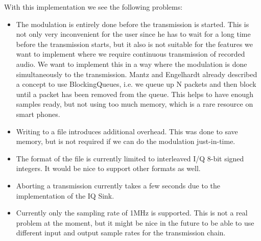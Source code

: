 \pagebreak
With this implementation we see the following problems: 
\begin{itemize}
	\item The modulation is entirely done before the transmission is started. This is not only very inconvenient for the user since he has to wait for a long time before the transmission starts, but it also is not suitable for the features we want to implement where we require continuous transmission of recorded audio. We want to implement this in a way where the modulation is done simultaneously to the transmission. Mantz and Engelhardt \cite{Mantz2016} already described a concept to use BlockingQueues, i.e. we queue up N packets and then block until a packet has been removed from the queue. This helps to have enough samples ready, but not using too much memory, which is a rare resource on smart phones. 
	\item Writing to a file introduces additional overhead. This was done to save memory, but is not required if we can do the modulation just-in-time. 
	\item The format of the file is currently limited to interleaved I/Q 8-bit signed integers. It would be nice to support other formats as well. 
	\item Aborting a transmission currently takes a few seconds due to the implementation of the IQ Sink. 
	\item Currently only the sampling rate of 1MHz is supported. This is not a real problem at the moment, but it might be nice in the future to be able to use different input and output sample rates for the transmission chain.
\end{itemize}

\label{sec:impl:feature1}
